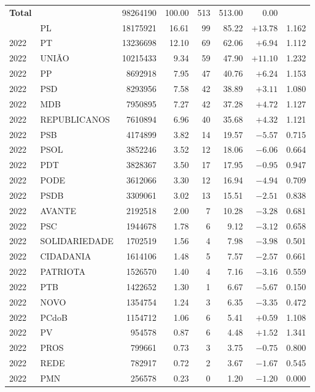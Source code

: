\begin{longtable}{@{}llrrrrrr@{}}
\midrule
\textbf{Total} &  & 98264190 & 100.00 & 513 & 513.00 & 0.00 &  \\
\addlinespace
2022 & PL & 18175921 & 16.61 & 99 & 85.22 & \(+13.78\) & 1.162 \\
2022 & PT & 13236698 & 12.10 & 69 & 62.06 & \(+6.94\) & 1.112 \\
2022 & UNIÃO & 10215433 & 9.34 & 59 & 47.90 & \(+11.10\) & 1.232 \\
2022 & PP & 8692918 & 7.95 & 47 & 40.76 & \(+6.24\) & 1.153 \\
2022 & PSD & 8293956 & 7.58 & 42 & 38.89 & \(+3.11\) & 1.080 \\
2022 & MDB & 7950895 & 7.27 & 42 & 37.28 & \(+4.72\) & 1.127 \\
2022 & REPUBLICANOS & 7610894 & 6.96 & 40 & 35.68 & \(+4.32\) & 1.121 \\
2022 & PSB & 4174899 & 3.82 & 14 & 19.57 & \(-5.57\) & 0.715 \\
2022 & PSOL & 3852246 & 3.52 & 12 & 18.06 & \(-6.06\) & 0.664 \\
2022 & PDT & 3828367 & 3.50 & 17 & 17.95 & \(-0.95\) & 0.947 \\
2022 & PODE & 3612066 & 3.30 & 12 & 16.94 & \(-4.94\) & 0.709 \\
2022 & PSDB & 3309061 & 3.02 & 13 & 15.51 & \(-2.51\) & 0.838 \\
2022 & AVANTE & 2192518 & 2.00 & 7 & 10.28 & \(-3.28\) & 0.681 \\
2022 & PSC & 1944678 & 1.78 & 6 & 9.12 & \(-3.12\) & 0.658 \\
2022 & SOLIDARIEDADE & 1702519 & 1.56 & 4 & 7.98 & \(-3.98\) & 0.501 \\
2022 & CIDADANIA & 1614106 & 1.48 & 5 & 7.57 & \(-2.57\) & 0.661 \\
2022 & PATRIOTA & 1526570 & 1.40 & 4 & 7.16 & \(-3.16\) & 0.559 \\
2022 & PTB & 1422652 & 1.30 & 1 & 6.67 & \(-5.67\) & 0.150 \\
2022 & NOVO & 1354754 & 1.24 & 3 & 6.35 & \(-3.35\) & 0.472 \\
2022 & PCdoB & 1154712 & 1.06 & 6 & 5.41 & \(+0.59\) & 1.108 \\
2022 & PV & 954578 & 0.87 & 6 & 4.48 & \(+1.52\) & 1.341 \\
2022 & PROS & 799661 & 0.73 & 3 & 3.75 & \(-0.75\) & 0.800 \\
2022 & REDE & 782917 & 0.72 & 2 & 3.67 & \(-1.67\) & 0.545 \\
2022 & PMN & 256578 & 0.23 & 0 & 1.20 & \(-1.20\) & 0.000 \\

\end{longtable}
